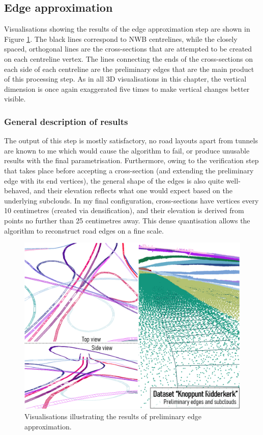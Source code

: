 \subsection{Edge approximation}
\label{sub:r_edgeapproximation}

Visualisations showing the results of the edge approximation step are shown in Figure \ref{fig:edgeapproximation0}. The black lines correspond to NWB centrelines, while the closely spaced, orthogonal lines are the cross-sections that are attempted to be created on each centreline vertex. The lines connecting the ends of the cross-sections on each side of each centreline are the preliminary edges that are the main product of this processing step. As in all 3D visualisations in this chapter, the vertical dimension is once again exaggerated five times to make vertical changes better visible.

\subsubsection{General description of results}

The output of this step is mostly satisfactory, no road layouts apart from tunnels are known to me which would cause the algorithm to fail, or produce unusable results with the final parametrisation. Furthermore, owing to the verification step that takes place before accepting a cross-section (and extending the preliminary edge with its end vertices), the general shape of the edges is also quite well-behaved, and their elevation reflects what one would expect based on the underlying subclouds. In my final configuration, cross-sections have vertices every 10 centimetres (created via densification), and their elevation is derived from points no further than 25 centimetres away. This dense quantisation allows the algorithm to reconstruct road edges on a fine scale.

\begin{figure}
    \centering
    \includegraphics[width=0.9\linewidth]{final_report/figs/edgeapproximation0.png}
    \caption{Visualisations illustrating the results of preliminary edge approximation.}
    \label{fig:edgeapproximation0}
\end{figure}

